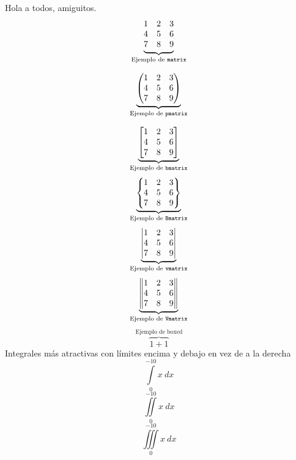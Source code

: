 \documentclass{article}
\begin{document}
Hola a todos, amiguitos.
\[
\underbrace{
    \begin{matrix}
    1 & 2 & 3 \\
    4 & 5 & 6 \\
    7 & 8 & 9
    \end{matrix}
}_{\textrm{Ejemplo de \texttt{matrix}}}
\]

\[
\underbrace{
    \begin{pmatrix}
    1 & 2 & 3 \\
    4 & 5 & 6 \\
    7 & 8 & 9
    \end{pmatrix}
}_{\textrm{Ejemplo de \texttt{pmatrix}}}
\]

\[
\underbrace{
    \begin{bmatrix}
    1 & 2 & 3 \\
    4 & 5 & 6 \\
    7 & 8 & 9
    \end{bmatrix}
}_{\textrm{Ejemplo de \texttt{bmatrix}}}
\]
\[
\underbrace{
    \begin{Bmatrix}
    1 & 2 & 3 \\
    4 & 5 & 6 \\
    7 & 8 & 9
    \end{Bmatrix}
}_{\textrm{Ejemplo de \texttt{Bmatrix}}}
\]
\[
\underbrace{
    \begin{vmatrix}
    1 & 2 & 3 \\
    4 & 5 & 6 \\
    7 & 8 & 9
    \end{vmatrix}
}_{\textrm{Ejemplo de \texttt{vmatrix}}}
\]
\[
\underbrace{
    \begin{Vmatrix}
    1 & 2 & 3 \\
    4 & 5 & 6 \\
    7 & 8 & 9
    \end{Vmatrix}
}_{\textrm{Ejemplo de \texttt{Vmatrix}}}
\]
\[
\overbrace{\boxed{1+1}}^{\textrm{Ejemplo de boxed}}
\]
Integrales más atractivas con límites encima y debajo en vez de a la derecha
\[
\int\limits_{0}^{-10}{x \: dx}
\]
\[
\iint\limits_{0}^{-10}{x \: dx}
\]
\[
\iiint\limits_{0}^{-10}{x \: dx}
\]
\end{document}
